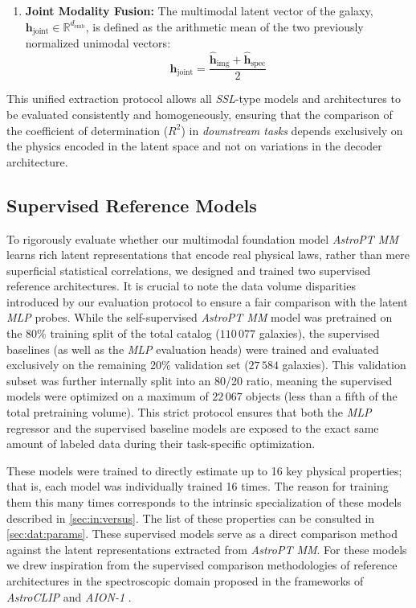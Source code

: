 \begin{enumerate}
    \item \textbf{Joint Modality Fusion:}
    The multimodal latent vector of the galaxy, $\mathbf{h}_{\text{joint}} \in \mathbb{R}^{d_{\text{emb}}}$, is defined as the arithmetic mean of the two previously normalized unimodal vectors:
    \begin{equation}
    \mathbf{h}_{\text{joint}} = \frac{\mathbf{\hat{h}}_{\text{img}} + \mathbf{\hat{h}}_{\text{spec}}}{2}
    \label{eq:mean_joint}
    \end{equation}
\end{enumerate}

This unified extraction protocol allows all \textit{\gls{SSL}}-type models and architectures to be evaluated consistently and homogeneously, ensuring that the comparison of the coefficient of determination ($R^2$) in \textit{downstream tasks} depends exclusively on the physics encoded in the latent space and not on variations in the decoder architecture.



\subsection{Supervised Reference Models} \label{sec:dev:sup}

To rigorously evaluate whether our multimodal foundation model \textit{AstroPT MM} learns rich latent representations that encode real physical laws, rather than mere superficial statistical correlations, we designed and trained two supervised reference architectures. It is crucial to note the data volume disparities introduced by our evaluation protocol to ensure a fair comparison with the latent \textit{\gls{MLP}} probes. While the self-supervised \textit{AstroPT MM} model was pretrained on the 80\% training split of the total catalog ($110\,077$ galaxies), the supervised baselines (as well as the \textit{\gls{MLP}} evaluation heads) were trained and evaluated exclusively on the remaining 20\% validation set ($27\,584$ galaxies). This validation subset was further internally split into an 80/20 ratio, meaning the supervised models were optimized on a maximum of $22\,067$ objects (less than a fifth of the total pretraining volume). This strict protocol ensures that both the \textit{\gls{MLP}} regressor and the supervised baseline models are exposed to the exact same amount of labeled data during their task-specific optimization.

These models were trained to directly estimate up to 16 key physical properties; that is, each model was individually trained 16 times. The reason for training them this many times corresponds to the intrinsic specialization of these models described in \cref{sec:in:versus}. The list of these properties can be consulted in \cref{sec:dat:params}. These supervised models serve as a direct comparison method against the latent representations extracted from \textit{AstroPT MM}. For these models we drew inspiration from the supervised comparison methodologies of reference architectures in the spectroscopic domain proposed in the frameworks of \textit{AstroCLIP} \autocite{ar:astroclip} and \textit{AION-1} \autocite{ar:aion-1}.

